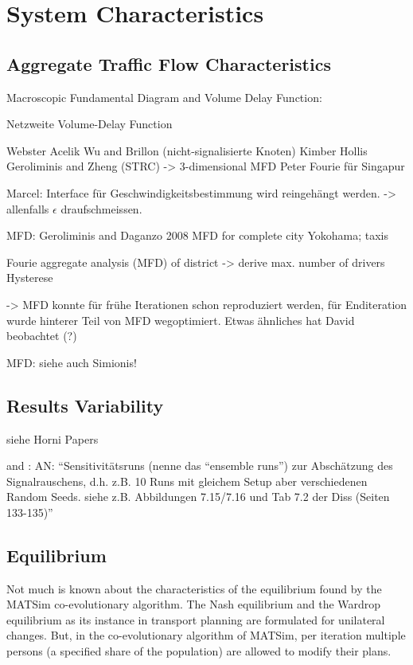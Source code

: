 \section{System Characteristics}
\subsection{Aggregate Traffic Flow Characteristics}
Macroscopic Fundamental Diagram and Volume Delay Function:

Netzweite Volume-Delay Function

Webster
Acelik
Wu and Brillon (nicht-signalisierte Knoten)
Kimber Hollis
Geroliminis and Zheng (STRC) -> 3-dimensional MFD
Peter Fourie für Singapur

Marcel: Interface für Geschwindigkeitsbestimmung wird reingehängt werden.
-> allenfalls $\epsilon$ draufschmeissen.

MFD:
Geroliminis and Daganzo 2008
MFD for complete city
Yokohama; taxis

Fourie
aggregate analysis (MFD) of district
-> derive max. number of drivers
Hysterese

-> MFD konnte für frühe Iterationen schon reproduziert werden, für Enditeration wurde hinterer Teil von MFD wegoptimiert. Etwas ähnliches hat David beobachtet (?)

MFD: siehe auch Simionis!

\subsection{Results Variability}
\label{sec:variability}

siehe Horni Papers

and \citet[][]{Neumann_PhDThesis_2014}: AN: ``Sensitivitätsruns (nenne das ``ensemble runs'') zur Abschätzung des Signalrauschens, d.h. z.B. 10 Runs mit gleichem Setup aber verschiedenen Random Seeds. siehe z.B. Abbildungen 7.15/7.16 und Tab 7.2 der Diss (Seiten 133-135)''

\subsection{Equilibrium}
\label{sec:matsimeq}
Not much is known about the characteristics of the equilibrium found by the MATSim co-evolutionary algorithm. The Nash equilibrium and the Wardrop equilibrium as its instance in transport planning are formulated for unilateral changes. But, in the co-evolutionary algorithm of MATSim, per iteration multiple persons (a specified share of the population) are allowed to modify their plans.

